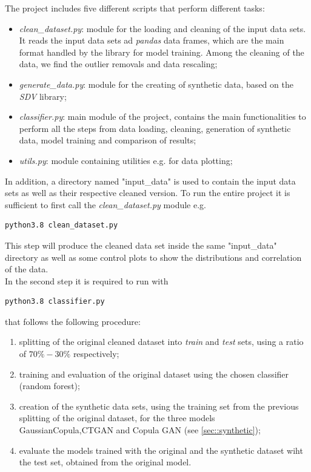\documentclass{article}
\begin{document}
The project includes five different scripts that perform different tasks:

\begin{itemize}
	\item \textit{clean\_dataset.py}: module for the loading and cleaning of the input data sets. It reads the input data sets ad \textit{pandas} data frames, which are the main format handled by the library for model training. Among the cleaning of the data, we find the outlier removals and data rescaling;\
	
	\item  \textit{generate\_data.py}: module for the creating of synthetic data, based on the \textit{SDV} library;\
	
	
	\item  \textit{classifier.py}: main module of the project, contains the main functionalities to perform all the steps from data loading, cleaning, generation of synthetic data, model training and comparison of results;\
	
	\item \textit{utils.py}: module containing utilities e.g. for data plotting;\
	 
\end{itemize}

In addition, a directory named "input\_data" is used to contain the input data sets as well as their respective cleaned version. 
To run the entire project it is sufficient to first call the \textit{clean\_dataset.py} module e.g. 
\begin{verbatim} 
python3.8 clean_dataset.py 
\end{verbatim} 

This step will produce the cleaned data set inside the same "input\_data" directory as well as some control plots to show the distributions and correlation of the data.
\\


In the second step it is required to run with 
\begin{verbatim} 
python3.8 classifier.py 
\end{verbatim} 
that follows the following procedure:

\begin{enumerate}
	\item splitting of the original cleaned dataset into \textit{train} and \textit{test} sets, using a ratio of $70\%-30\%$ respectively; \
	
	\item  training and evaluation of the original dataset using the chosen classifier (random forest);
	
	
	\item  creation of the synthetic data sets, using the training set from the previous splitting of the original dataset, for the three models GaussianCopula,CTGAN and Copula GAN (see \ref{sec::synthetic});
	
	\item evaluate the models trained with the original and the synthetic dataset wiht the test set, obtained from the original model.
	
\end{enumerate}
\end{document}
